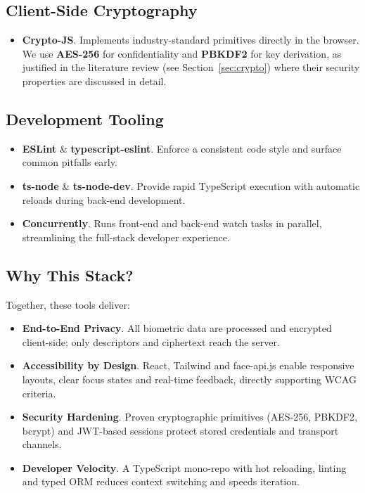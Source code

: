 \subsection*{Client-Side Cryptography}
\begin{itemize}
  \item \textbf{Crypto-JS}. Implements industry-standard primitives directly in the browser. We use \textbf{AES-256} for confidentiality and \textbf{PBKDF2} for key derivation, as justified in the literature review (see Section~\ref{sec:crypto}) where their security properties are discussed in detail.
\end{itemize}

\subsection*{Development Tooling}
\begin{itemize}
  \item \textbf{ESLint} \& \textbf{typescript-eslint}. Enforce a consistent code style and surface common pitfalls early.
  \item \textbf{ts-node} \& \textbf{ts-node-dev}. Provide rapid TypeScript execution with automatic reloads during back-end development.
  \item \textbf{Concurrently}. Runs front-end and back-end watch tasks in parallel, streamlining the full-stack developer experience.
\end{itemize}

\subsection*{Why This Stack?}
Together, these tools deliver:

\begin{itemize}
  \item \textbf{End-to-End Privacy}. All biometric data are processed and encrypted client-side; only descriptors and ciphertext reach the server.
  \item \textbf{Accessibility by Design}. React, Tailwind and face-api.js enable responsive layouts, clear focus states and real-time feedback, directly supporting WCAG criteria.
  \item \textbf{Security Hardening}. Proven cryptographic primitives (AES-256, PBKDF2, bcrypt) and JWT-based sessions protect stored credentials and transport channels.
  \item \textbf{Developer Velocity}. A TypeScript mono-repo with hot reloading, linting and typed ORM reduces context switching and speeds iteration.
\end{itemize}

